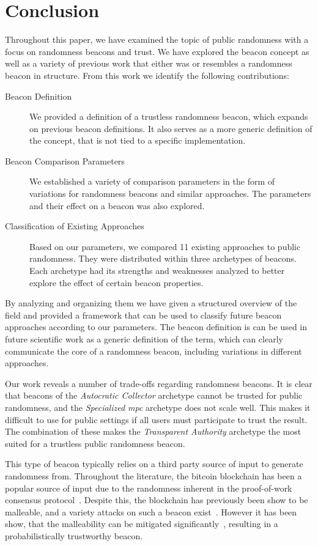 \section{Conclusion}\label{sec:conclusion}
Throughout this paper, we have examined the topic of public randomness with a focus on randomness beacons and trust.
We have explored the beacon concept as well as a variety of previous work that either was or resembles a randomness beacon in structure.
From this work we identify the following contributions:

\begin{description}
    \item [Beacon Definition] We provided a definition of a trustless randomness beacon, which expands on previous beacon definitions.
It also serves as a more generic definition of the concept, that is not tied to a specific implementation.
    \item [Beacon Comparison Parameters] We established a variety of comparison parameters in the form of variations for randomness beacons and similar approaches.
The parameters and their effect on a beacon was also explored.
    \item [Classification of Existing Approaches] Based on our parameters, we compared 11 existing approaches to public randomness.
They were distributed within three archetypes of beacons.
Each archetype had its strengths and weaknesses analyzed to better explore the effect of certain beacon properties.
\end{description}

By analyzing and organizing them we have given a structured overview of the field and provided a framework that can be used to classify future beacon approaches according to our parameters.
The beacon definition is can be used in future scientific work as a generic definition of the term, which can clearly communicate the core of a randomness beacon, including variations in different approaches.

Our work reveals a number of trade-offs regarding randomness beacons.
It is clear that beacons of the \emph{Autocratic Collector} archetype cannot be trusted for public randomness, and the \emph{Specialized \gls{mpc}} archetype does not scale well.
This makes it difficult to use for public settings if all users must participate to trust the result.
The combination of these makes the \emph{Transparent Authority} archetype the most suited for a trustless public randomness beacon.

This type of beacon typically relies on a third party source of input to generate randomness from.
Throughout the literature, the bitcoin blockchain has been a popular source of input due to the randomness inherent in the proof-of-work consensus protocol~\cite{bonneau2015bitcoin}.
Despite this, the blockchain has previously been show to be malleable, and a variety attacks on such a beacon exist~\cite{bonneau2015bitcoin, bentov2016bitcoin, pierrot2016malleability}.
However it has been show, that the malleability can be mitigated significantly~\cite{bunz2017proofsof}, resulting in a probabilistically trustworthy beacon.

